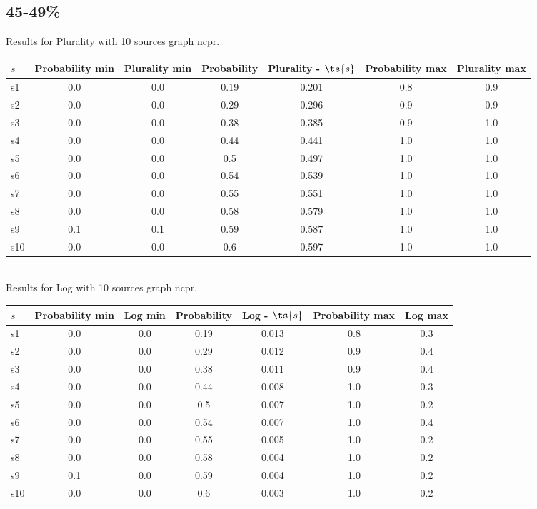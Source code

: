 \documentclass{article}
\begin{document}
\newpage

\subsection{45-49\%}

\noindent Results for Plurality with 10 sources graph ncpr.

\noindent\begin{tabular}{|l|c|c|c|c|c|c|}
\hline
$s$& Probability min & Plurality min & Probability & Plurality - $\ts{s}$ & Probability max & Plurality max\\
\hline
s1 &0.0 & 0.0 & 0.19 & 0.201 & 0.8 & 0.9\\
\hline
s2 &0.0 & 0.0 & 0.29 & 0.296 & 0.9 & 0.9\\
\hline
s3 &0.0 & 0.0 & 0.38 & 0.385 & 0.9 & 1.0\\
\hline
s4 &0.0 & 0.0 & 0.44 & 0.441 & 1.0 & 1.0\\
\hline
s5 &0.0 & 0.0 & 0.5 & 0.497 & 1.0 & 1.0\\
\hline
s6 &0.0 & 0.0 & 0.54 & 0.539 & 1.0 & 1.0\\
\hline
s7 &0.0 & 0.0 & 0.55 & 0.551 & 1.0 & 1.0\\
\hline
s8 &0.0 & 0.0 & 0.58 & 0.579 & 1.0 & 1.0\\
\hline
s9 &0.1 & 0.1 & 0.59 & 0.587 & 1.0 & 1.0\\
\hline
s10 &0.0 & 0.0 & 0.6 & 0.597 & 1.0 & 1.0\\
\hline
\end{tabular}\\

\noindent Results for Log with 10 sources graph ncpr.

\noindent\begin{tabular}{|l|c|c|c|c|c|c|}
\hline
$s$& Probability min & Log min & Probability & Log - $\ts{s}$ & Probability max & Log max\\
\hline
s1 &0.0 & 0.0 & 0.19 & 0.013 & 0.8 & 0.3\\
\hline
s2 &0.0 & 0.0 & 0.29 & 0.012 & 0.9 & 0.4\\
\hline
s3 &0.0 & 0.0 & 0.38 & 0.011 & 0.9 & 0.4\\
\hline
s4 &0.0 & 0.0 & 0.44 & 0.008 & 1.0 & 0.3\\
\hline
s5 &0.0 & 0.0 & 0.5 & 0.007 & 1.0 & 0.2\\
\hline
s6 &0.0 & 0.0 & 0.54 & 0.007 & 1.0 & 0.4\\
\hline
s7 &0.0 & 0.0 & 0.55 & 0.005 & 1.0 & 0.2\\
\hline
s8 &0.0 & 0.0 & 0.58 & 0.004 & 1.0 & 0.2\\
\hline
s9 &0.1 & 0.0 & 0.59 & 0.004 & 1.0 & 0.2\\
\hline
s10 &0.0 & 0.0 & 0.6 & 0.003 & 1.0 & 0.2\\
\hline
\end{tabular}\\
\end{document}
